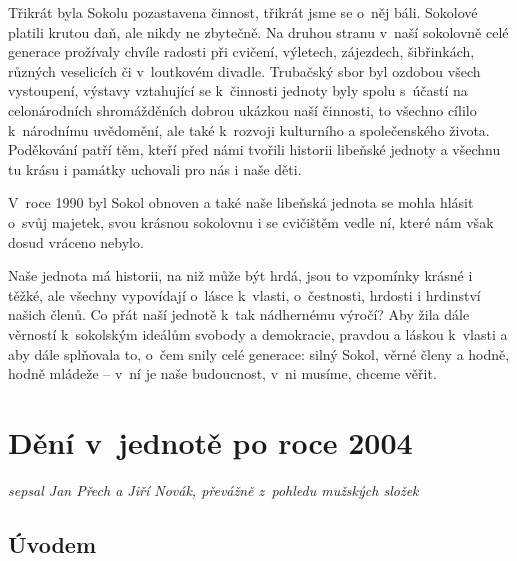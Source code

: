 \documentclass[a5paper, 11pt, twoside]{article}
\begin{document}
Třikrát byla Sokolu pozastavena činnost, třikrát jsme se o~něj báli.
Sokolové platili krutou daň, ale nikdy ne zbytečně. Na druhou stranu
v~naší sokolovně celé generace prožívaly chvíle radosti při cvičení,
výletech, zájezdech, šibřinkách, různých veselicích či v~loutkovém
divadle. Trubačský sbor byl ozdobou všech vystoupení, výstavy vztahující
se k~činnosti jednoty byly spolu s~účastí na celonárodních shromážděních
dobrou ukázkou naší činnosti, to všechno cílilo k~národnímu uvědomění,
ale také k~rozvoji kulturního a společenského života. Poděkování patří
těm, kteří před námi tvořili historii libeňské jednoty a všechnu tu
krásu i památky uchovali pro nás i naše děti.

V~roce 1990 byl Sokol obnoven a také naše libeňská jednota se mohla
hlásit o~svůj majetek, svou krásnou sokolovnu i se cvičištěm vedle ní,
které nám však dosud vráceno nebylo.

Naše jednota má historii, na niž může být hrdá, jsou to vzpomínky krásné
i těžké, ale všechny vypovídají o~lásce k~vlasti, o~čestnosti, hrdosti i
hrdinství našich členů. Co přát naší jednotě k~tak nádhernému výročí?
Aby žila dále věrností k~sokolským ideálům svobody a demokracie, pravdou
a láskou k~vlasti a aby dále splňovala to, o~čem snily celé generace:
silný Sokol, věrné členy a hodně, hodně mládeže --⁠⁠⁠⁠⁠⁠ v~ní je naše
budoucnost, v~ni musíme, chceme věřit.

\clearpage

\section{Dění v~jednotě po roce 2004}

\begin{center}
  \textit{sepsal Jan Přech a Jiří Novák, převážně z~pohledu mužských složek}
\end{center}

\subsection{Úvodem}
\end{document}
